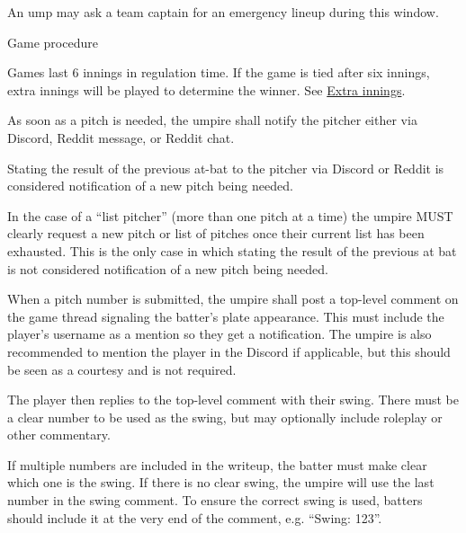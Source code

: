 \begin{deepEnumerate}
\begin{deepEnumerate}
\begin{deepEnumerate}
\begin{deepEnumerate}
				\begin{deepEnumerate}
					\item An ump may ask a team captain for an emergency lineup during this window.
				\end{deepEnumerate}
			\end{deepEnumerate}
		\end{deepEnumerate}
	\end{deepEnumerate}
	\item Game procedure
	\begin{deepEnumerate}
		\item Games last 6 innings in regulation time. If the game is tied after six innings, extra innings will be played to determine the winner. 
		See \hyperref[sec:extra innings]{Extra innings}.
		\item As soon as a pitch is needed, the umpire shall notify the pitcher either via Discord, Reddit message, or Reddit chat.
		\begin{deepEnumerate}
			\item Stating the result of the previous at-bat to the pitcher via Discord or Reddit is considered notification of a new pitch being needed.
			\item  In the case of a “list pitcher” (more than one pitch at a time) the umpire MUST clearly request a new pitch or list
			 of pitches once their current list has been exhausted. This is the only case in which stating the result of the previous
			 at bat is not considered notification of a new pitch being needed.
		\end{deepEnumerate}
		\item When a pitch number is submitted, the umpire shall post a top-level comment on the game thread signaling the batter's plate appearance. 
		This must include the player's username as a mention so they get a notification. The umpire is also recommended to mention the player in the Discord if applicable, 
		but this should be seen as a courtesy and is not required.
		\item The player then replies to the top-level comment with their swing. There must be a clear number to be used as the swing, 
		but may optionally include roleplay or other commentary.
		\begin{deepEnumerate}
			\item If multiple numbers are included in the writeup, the batter must make clear which one is the swing. If there is no clear swing, the umpire will use 
			the last number in the swing comment. To ensure the correct swing is used, batters should include it at the very end of the comment, e.g. “Swing: 123”.

\end{deepEnumerate}
\end{deepEnumerate}
\end{deepEnumerate}
